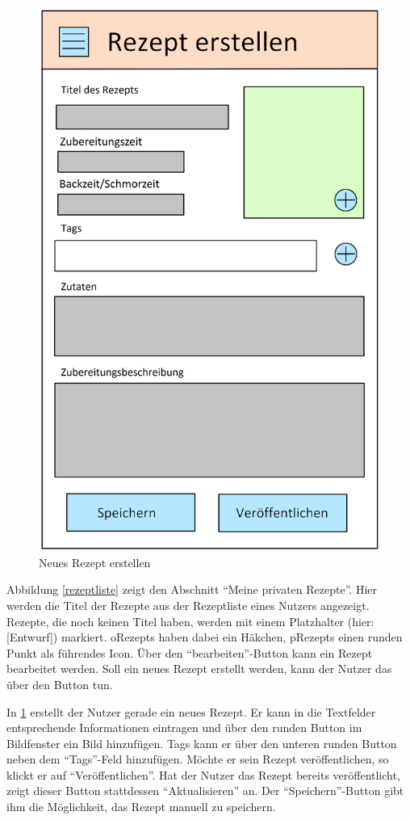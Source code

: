 \begin{figure}[H]
\begin{minipage}[c]{.5\textwidth}
			\includegraphics[width=\textwidth]{gui/rezept_erstellen.png}				
		\caption{Neues Rezept erstellen}
		\label{erstellen}
	\end{minipage}
\end{figure}


Abbildung \ref{rezeptliste} zeigt den Abschnitt "`Meine privaten Rezepte"'. Hier werden die Titel der Rezepte aus der \gls{Rezeptliste} eines Nutzers angezeigt. Rezepte, die noch keinen Titel haben, werden mit einem Platzhalter (hier: [Entwurf]) markiert. 
\Glspl{oRezept} haben dabei ein Häkchen, \glspl{pRezept} einen runden Punkt als führendes Icon. 
Über den "`bearbeiten"'-Button kann ein Rezept bearbeitet werden. 
Soll ein neues Rezept erstellt werden, kann der Nutzer das über den Button tun.

In \ref{erstellen} erstellt der Nutzer gerade ein neues Rezept. Er kann in die Textfelder entsprechende Informationen eintragen und über den runden Button im Bildfenster ein Bild hinzufügen. \glspl{Tag} kann er über den unteren runden Button neben dem "`\glspl{Tag}"'-Feld hinzufügen. Möchte er sein Rezept veröffentlichen, so klickt er auf "`Veröffentlichen"'. Hat der Nutzer das Rezept bereits veröffentlicht, zeigt dieser Button stattdessen "`Aktualisieren"' an. Der "`Speichern"'-Button gibt ihm die Möglichkeit, das Rezept manuell zu speichern. 

